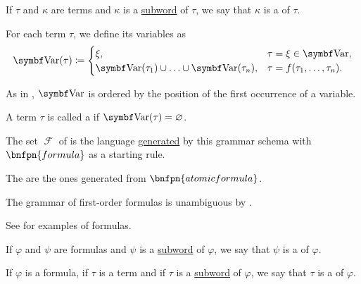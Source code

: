 \begin{definition}
\begin{defenum}
     If \( \tau \) and \( \kappa \) are terms and \( \kappa \) is a \hyperref[def:language/subword]{subword} of \( \tau \), we say that \( \kappa \) is a  of \( \tau \).

     For each term \( \tau \), we define its variables as
    \begin{equation}\label{eq:def:first_order_syntax/term_variables}
      \bfop{Var}(\tau) \coloneqq \begin{cases}
        \xi,                                                    &\tau = \xi \in \bfop{Var},        \\
        \bfop{Var}(\tau_1) \cup \ldots \cup \bfop{Var}(\tau_n), &\tau = f(\tau_1, \ldots, \tau_n).
      \end{cases}
    \end{equation}

    As in , \( \bfop{Var} \) is ordered by the position of the first occurrence of a variable.

     A term \( \tau \) is called a  if \( \bfop{Var}(\tau) = \varnothing \).

     The set \( \mscrF \) of  is the language \hyperref[def:grammar_derivation/grammar_language]{generated} by this grammar schema with \( \bnfpn{formula} \) as a starting rule.

    The  are the ones generated from \( \bnfpn{atomic formula} \).

    The grammar of first-order formulas is unambiguous by .

    See  for examples of formulas.

     If \( \varphi \) and \( \psi \) are formulas and \( \psi \) is a \hyperref[def:language/subword]{subword} of \( \varphi \), we say that \( \psi \) is a  of \( \varphi \).

     If \( \varphi \) is a formula, if \( \tau \) is a term and if \( \tau \) is a \hyperref[def:language/subword]{subword} of \( \varphi \), we say that \( \tau \) is a  of \( \varphi \).


\end{defenum}
\end{definition}
